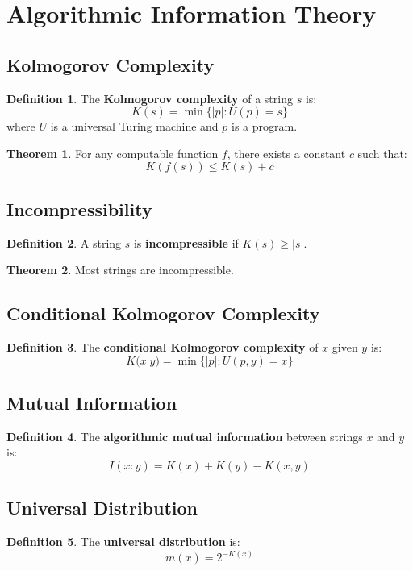 \documentclass[11pt]{article}
\theoremstyle{definition}
\newtheorem{definition}{Definition}[section]
\newtheorem{theorem}{Theorem}[section]
\begin{document}
\section{Algorithmic Information Theory}

\subsection{Kolmogorov Complexity}
\begin{definition}
The \textbf{Kolmogorov complexity} of a string $s$ is:
$$K(s) = \min\{|p| : U(p) = s\}$$
where $U$ is a universal Turing machine and $p$ is a program.
\end{definition}

\begin{theorem}
For any computable function $f$, there exists a constant $c$ such that:
$$K(f(s)) \leq K(s) + c$$
\end{theorem}

\subsection{Incompressibility}
\begin{definition}
A string $s$ is \textbf{incompressible} if $K(s) \geq |s|$.
\end{definition}

\begin{theorem}
Most strings are incompressible.
\end{theorem}

\subsection{Conditional Kolmogorov Complexity}
\begin{definition}
The \textbf{conditional Kolmogorov complexity} of $x$ given $y$ is:
$$K(x|y) = \min\{|p| : U(p, y) = x\}$$
\end{definition}

\subsection{Mutual Information}
\begin{definition}
The \textbf{algorithmic mutual information} between strings $x$ and $y$ is:
$$I(x:y) = K(x) + K(y) - K(x,y)$$
\end{definition}

\subsection{Universal Distribution}
\begin{definition}
The \textbf{universal distribution} is:
$$m(x) = 2^{-K(x)}$$
\end{definition}
\end{document}
